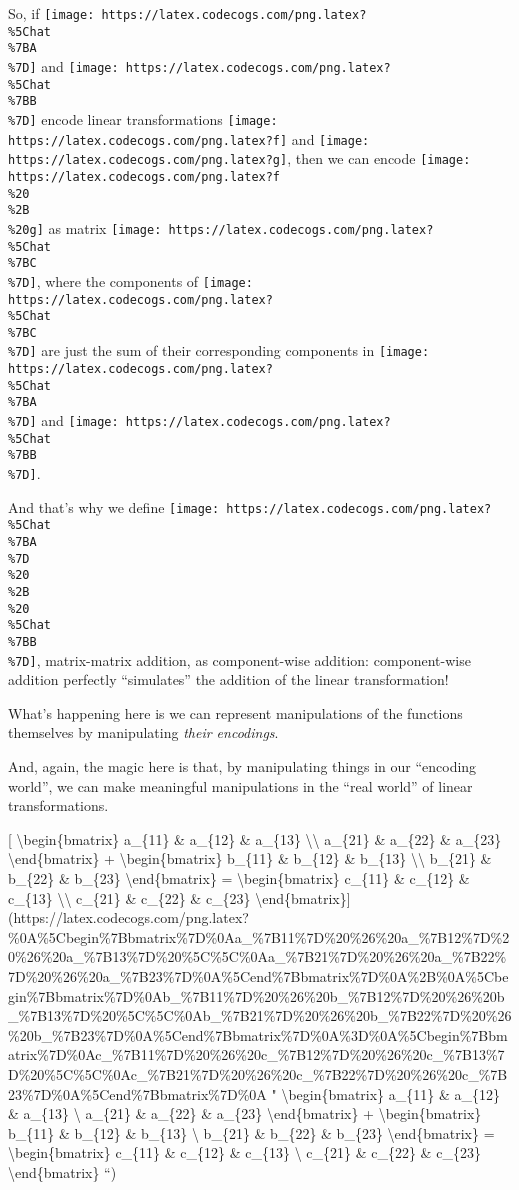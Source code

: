 \documentclass[]{article}
\begin{document}
So, if \texttt{[image: https://latex.codecogs.com/png.latex?\\\%5Chat\\\%7BA\\\%7D]}
and \texttt{[image: https://latex.codecogs.com/png.latex?\\\%5Chat\\\%7BB\\\%7D]}
encode linear transformations
\texttt{[image: https://latex.codecogs.com/png.latex?f]} and
\texttt{[image: https://latex.codecogs.com/png.latex?g]}, then we can encode
\texttt{[image: https://latex.codecogs.com/png.latex?f\\\%20\\\%2B\\\%20g]} as matrix
\texttt{[image: https://latex.codecogs.com/png.latex?\\\%5Chat\\\%7BC\\\%7D]}, where
the components of
\texttt{[image: https://latex.codecogs.com/png.latex?\\\%5Chat\\\%7BC\\\%7D]} are just
the sum of their corresponding components in
\texttt{[image: https://latex.codecogs.com/png.latex?\\\%5Chat\\\%7BA\\\%7D]} and
\texttt{[image: https://latex.codecogs.com/png.latex?\\\%5Chat\\\%7BB\\\%7D]}.

And that's why we define
\texttt{[image: https://latex.codecogs.com/png.latex?\\\%5Chat\\\%7BA\\\%7D\\\%20\\\%2B\\\%20\\\%5Chat\\\%7BB\\\%7D]},
matrix-matrix addition, as component-wise addition: component-wise addition
perfectly ``simulates'' the addition of the linear transformation!

What's happening here is we can represent manipulations of the functions
themselves by manipulating \emph{their encodings}.

And, again, the magic here is that, by manipulating things in our ``encoding
world'', we can make meaningful manipulations in the ``real world'' of linear
transformations.

{[} \textbackslash{}begin\{bmatrix\} a\_\{11\} \& a\_\{12\} \& a\_\{13\}
\textbackslash{}\textbackslash{} a\_\{21\} \& a\_\{22\} \& a\_\{23\}
\textbackslash{}end\{bmatrix\} + \textbackslash{}begin\{bmatrix\} b\_\{11\} \&
b\_\{12\} \& b\_\{13\} \textbackslash{}\textbackslash{} b\_\{21\} \& b\_\{22\}
\& b\_\{23\} \textbackslash{}end\{bmatrix\} = \textbackslash{}begin\{bmatrix\}
c\_\{11\} \& c\_\{12\} \& c\_\{13\} \textbackslash{}\textbackslash{} c\_\{21\}
\& c\_\{22\} \& c\_\{23\}
\textbackslash{}end\{bmatrix\}{]}(https://latex.codecogs.com/png.latex?\%0A\%5Cbegin\%7Bbmatrix\%7D\%0Aa\_\%7B11\%7D\%20\%26\%20a\_\%7B12\%7D\%20\%26\%20a\_\%7B13\%7D\%20\%5C\%5C\%0Aa\_\%7B21\%7D\%20\%26\%20a\_\%7B22\%7D\%20\%26\%20a\_\%7B23\%7D\%0A\%5Cend\%7Bbmatrix\%7D\%0A\%2B\%0A\%5Cbegin\%7Bbmatrix\%7D\%0Ab\_\%7B11\%7D\%20\%26\%20b\_\%7B12\%7D\%20\%26\%20b\_\%7B13\%7D\%20\%5C\%5C\%0Ab\_\%7B21\%7D\%20\%26\%20b\_\%7B22\%7D\%20\%26\%20b\_\%7B23\%7D\%0A\%5Cend\%7Bbmatrix\%7D\%0A\%3D\%0A\%5Cbegin\%7Bbmatrix\%7D\%0Ac\_\%7B11\%7D\%20\%26\%20c\_\%7B12\%7D\%20\%26\%20c\_\%7B13\%7D\%20\%5C\%5C\%0Ac\_\%7B21\%7D\%20\%26\%20c\_\%7B22\%7D\%20\%26\%20c\_\%7B23\%7D\%0A\%5Cend\%7Bbmatrix\%7D\%0A
" \textbackslash{}begin\{bmatrix\} a\_\{11\} \& a\_\{12\} \& a\_\{13\}
\textbackslash{} a\_\{21\} \& a\_\{22\} \& a\_\{23\}
\textbackslash{}end\{bmatrix\} + \textbackslash{}begin\{bmatrix\} b\_\{11\} \&
b\_\{12\} \& b\_\{13\} \textbackslash{} b\_\{21\} \& b\_\{22\} \& b\_\{23\}
\textbackslash{}end\{bmatrix\} = \textbackslash{}begin\{bmatrix\} c\_\{11\} \&
c\_\{12\} \& c\_\{13\} \textbackslash{} c\_\{21\} \& c\_\{22\} \& c\_\{23\}
\textbackslash{}end\{bmatrix\} ``)
\end{document}
